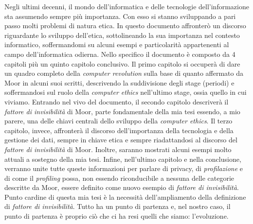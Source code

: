 Negli ultimi decenni, il mondo dell’informatica e delle tecnologie dell’informazione sta assumendo sempre più importanza. Con esso si stanno sviluppando a pari passo molti problemi di natura etica. 
In questo documento affronterò un discorso riguardante lo sviluppo dell’etica, sottolineando la sua importanza nel contesto informatico, soffermandomi su alcuni esempi e particolarità appartenenti al campo dell’informatica odierna.
Nello specifico il documento è composto da 4 capitoli più un quinto capitolo conclusivo.
Il primo capitolo si occuperà di dare un quadro completo della \textit{computer revolution} sulla base di quanto affermato da Moor in alcuni suoi scritti, descrivendo la suddivisione degli stage (periodi) e soffermandosi sul ruolo della \textit{computer ethics} nell’ultimo stage, ossia quello in cui viviamo.
Entrando nel vivo del documento, il secondo capitolo descriverà il \textit{fattore di invisibilità} di Moor, parte fondamentale della mia tesi essendo, a mio parere, una delle chiavi centrali dello sviluppo della \textit{computer ethics}.
Il terzo capitolo, invece, affronterà il discorso dell’importanza della tecnologia e della gestione dei dati, sempre in chiave etica e sempre riadattandosi al discorso del \textit{fattore di invisibilità} di Moor. Inoltre, saranno mostrati alcuni esempi molto attuali a sostegno della mia tesi.
Infine, nell’ultimo capitolo e nella conclusione, verranno unite tutte queste informazioni per parlare di privacy, di \textit{profilazione} e di come il \textit{profiling} possa, non essendo riconducibile a nessuna delle categorie descritte da Moor, essere definito come nuovo esempio di \textit{fattore di invisibilità}. Punto cardine di questa mia tesi è la necessità dell’ampliamento della definizione di \textit{fattore di invisibilità}.
Tutto ha un punto di partenza e, nel nostro caso, il punto di partenza è proprio ciò che ci ha resi quelli che siamo: l’evoluzione.